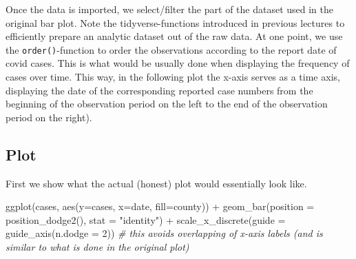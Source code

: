 \documentclass[
  12pt,
]{style/krantz}
\newenvironment{Shaded}{\begin{snugshade}}{\end{snugshade}}
\newcommand{\AttributeTok}[1]{\textcolor[rgb]{0.77,0.63,0.00}{#1}}
\newcommand{\CommentTok}[1]{\textcolor[rgb]{0.56,0.35,0.01}{\textit{#1}}}
\newcommand{\DecValTok}[1]{\textcolor[rgb]{0.00,0.00,0.81}{#1}}
\newcommand{\FunctionTok}[1]{\textcolor[rgb]{0.00,0.00,0.00}{#1}}
\newcommand{\NormalTok}[1]{#1}
\newcommand{\OtherTok}[1]{\textcolor[rgb]{0.56,0.35,0.01}{#1}}
\newcommand{\SpecialCharTok}[1]{\textcolor[rgb]{0.00,0.00,0.00}{#1}}
\newcommand{\StringTok}[1]{\textcolor[rgb]{0.31,0.60,0.02}{#1}}
\begin{document}
Once the data is imported, we select/filter the part of the dataset used in the original bar plot. Note the tidyverse-functions introduced in previous lectures to efficiently prepare an analytic dataset out of the raw data. At one point, we use the \texttt{order()}-function to order the observations according to the report date of covid cases. This is what would be usually done when displaying the frequency of cases over time. This way, in the following plot the x-axis serves as a time axis, displaying the date of the corresponding reported case numbers from the beginning of the observation period on the left to the end of the observation period on the right).

\begin{Shaded}
\end{Shaded}

\hypertarget{plot}{%
\subsection{Plot}\label{plot}}

First we show what the actual (honest) plot would essentially look like.

\begin{Shaded}
\begin{Highlighting}[]
\FunctionTok{ggplot}\NormalTok{(cases, }\FunctionTok{aes}\NormalTok{(}\AttributeTok{y=}\NormalTok{cases, }\AttributeTok{x=}\NormalTok{date, }\AttributeTok{fill=}\NormalTok{county)) }\SpecialCharTok{+}
  \FunctionTok{geom\_bar}\NormalTok{(}\AttributeTok{position =} \FunctionTok{position\_dodge2}\NormalTok{(), }\AttributeTok{stat =} \StringTok{"identity"}\NormalTok{) }\SpecialCharTok{+} 
  \FunctionTok{scale\_x\_discrete}\NormalTok{(}\AttributeTok{guide =} \FunctionTok{guide\_axis}\NormalTok{(}\AttributeTok{n.dodge =} \DecValTok{2}\NormalTok{)) }\CommentTok{\# this avoids overlapping of x{-}axis labels (and is similar to what is done in the original plot)}
\end{Highlighting}
\end{Shaded}
\end{document}
